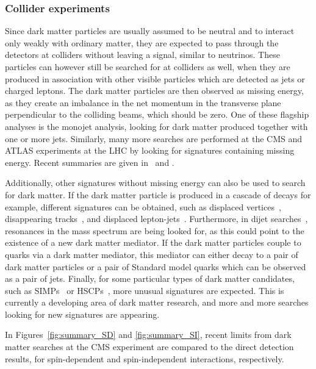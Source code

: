 \subsubsection{Collider experiments}

Since dark matter particles are usually assumed to be neutral and to interact only weakly with ordinary matter, they are expected to pass through the detectors at colliders without leaving a signal, similar to neutrinos. These particles can however still be searched for at colliders as well, when they are produced in association with other visible particles which are detected as jets or charged leptons. The dark matter particles are then observed as missing energy, as they create an imbalance in the net momentum in the transverse plane perpendicular to the colliding beams, which should be zero. One of these flagship analyses is the monojet analysis, looking for dark matter produced together with one or more jets\cite{Sirunyan:2017hci,Aaboud:2016qgg}. Similarly, many more searches are performed at the \acs{CMS} and \acs{ATLAS} experiments at the \ac{LHC} by looking for signatures containing missing energy. Recent summaries are given in~\cite{Kahlhoefer:2017dnp} and \cite{Buchmueller:2017qhf}.

Additionally, other signatures without missing energy can also be used to search for dark matter. If the dark matter particle is produced in a cascade of decays for example, different signatures can be obtained, such as displaced vertices~\cite{ATLAS:2017bvh}, disappearing tracks~\cite{ATLAS:2017bna}, and displaced lepton-jets~\cite{ATLAS:2017lvz}. Furthermore, in dijet searches~\cite{Sirunyan:2017ygf, Sirunyan:2016iap, Aaboud:2017yvp}, resonances in the mass spectrum are being looked for, as this could point to the existence of a new dark matter mediator. If the dark matter particles couple to quarks via a dark matter mediator, this mediator can either decay to a pair of dark matter particles or a pair of Standard model quarks which can be observed as a pair of jets.  Finally, for some particular types of dark matter candidates, such as \acfp{SIMP}~\cite{Bai:2011wy} or \acp{HSCP}~\cite{CMS:2016ybj,Aaboud:2016dgf}, more unusual signatures are expected. This is currently a developing area of dark matter research, and more and more searches looking for new signatures are appearing.

In Figures~\ref{fig:summary_SD} and \ref{fig:summary_SI}, recent limits from dark matter searches at the \acs{CMS} experiment are compared to the direct detection results, for spin-dependent and spin-independent interactions, respectively.

